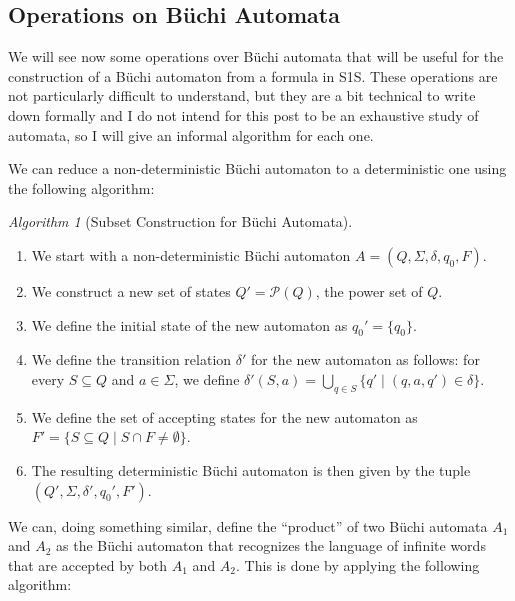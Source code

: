 \documentclass[11pt]{article}
\theoremstyle{definition}
\theoremstyle{remark}
\newtheorem{algorithm}{Algorithm}
\begin{document}
\subsection{Operations on Büchi Automata}

We will see now some operations over Büchi automata that will be useful for the construction of a Büchi automaton from a formula in S1S. These operations are not particularly difficult to understand, but they are a bit technical to write down formally and I do not intend for this post to be an exhaustive study of automata, so I will give an informal algorithm for each one.

We can reduce a non-deterministic Büchi automaton to a deterministic one using the following algorithm:

\begin{algorithm}[Subset Construction for Büchi Automata]\label{def:subset-construction}
\begin{enumerate}[leftmargin=1.5em]
  \item We start with a non-deterministic Büchi automaton $A=(Q,\Sigma,\delta,q_0,F)$.
  \item We construct a new set of states $Q'=\mathcal{P}(Q)$, the power set of $Q$.
  \item We define the initial state of the new automaton as $q_0'=\{q_0\}$.
  \item We define the transition relation $\delta'$ for the new automaton as follows: for every $S \subseteq Q$ and $a \in \Sigma$, we define $\delta'(S,a)=\bigcup_{q \in S} \{ q' \mid (q,a,q') \in \delta \}$.
  \item We define the set of accepting states for the new automaton as $F'=\{ S \subseteq Q \mid S \cap F \neq \emptyset \}$.
  \item The resulting deterministic Büchi automaton is then given by the tuple $(Q',\Sigma,\delta',q_0',F')$.
\end{enumerate}
\end{algorithm}

We can, doing something similar, define the ``product'' of two Büchi automata $A_1$ and $A_2$ as the Büchi automaton that recognizes the language of infinite words that are accepted by both $A_1$ and $A_2$. This is done by applying the following algorithm:
\end{document}
